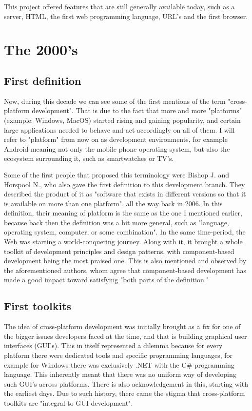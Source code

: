 \par
This project offered features that are still generally available today, such as a server, HTML, the first web programming language, URL's and the first browser.

\section{The 2000's}

\subsection{First definition}
Now, during this decade we can see some of the first mentions of the term "cross-platform development".
That is due to the fact that more and more "platforms" (example: Windows, MacOS) started rising and gaining popularity, and certain large applications needed to behave and act accordingly on all of them.
I will refer to "platform" from now on as development environments, for example Android meaning not only the mobile phone operating system, but also the ecosystem surrounding it, such as smartwatches or TV's.

\par
Some of the first people that proposed this terminology were Bishop J.
and Horspool N., who also gave the first definition to this development branch.
They described the product of it as "software that exists in different versions so that it is available on more than one platform"\cite{firstDefinition}, all the way back in 2006.
In this definition, their meaning of platform is the same as the one I mentioned earlier, because back then the definition was a bit more general, such as "language, operating system, computer, or some combination".
In the same time-period, the Web was starting a world-conquering journey.
Along with it, it brought a whole toolkit of development principles and design patterns, with component-based development being the most praised one.
This is also mentioned and observed by the aforementioned authors, whom agree that component-based development  has made a good impact  toward satisfying "both parts of the definition."\cite{firstDefinition}

\subsection{First toolkits}
The idea of cross-platform development was initially brought as a fix for one of the bigger issues developers faced at the time, and that is building graphical user interfaces (GUI's).
This in itself represented a dilemma because for every platform there were dedicated tools and specific programming languages, for example for Windows there was exclusively .NET with the C\# programming language.
This inherently meant that there was no uniform way of developing such GUI's across platforms.
There is also acknowledgement in this, starting with the earliest days.
Due to such history, there came the stigma that cross-platform toolkits are "integral to GUI development"\cite{firstDefinition}.

